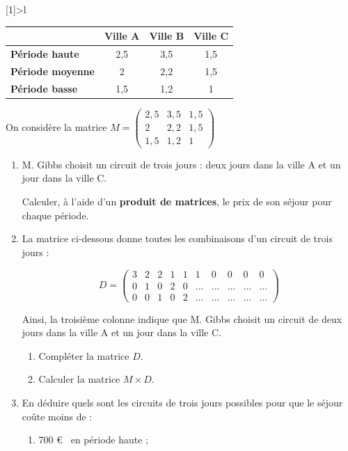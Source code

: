 \begin{spacing}{1.2}
\begin{center}
\newcolumntype{K}[1]{>{}l}
\begin{tabular}{|K{gray}|*{3}{c|}}
 &  \bf Ville A & \bf Ville B & \bf Ville C\\
\hline
\bf Période haute & 2,5 & 3,5 & 1,5\\
\hline
\bf Période moyenne & 2 & 2,2 & 1,5\\
\hline
\bf Période basse & 1,5 & 1,2 & 1\\
\hline
\end{tabular}
\end{center}

On considère la matrice $M=\begin{pmatrix}
2,5&3,5&1,5\\2&2,2&1,5\\1,5&1,2&1
\end{pmatrix}$

\begin{enumerate}[\bf 1.]
\item M. Gibbs choisit un circuit de trois jours : deux jours dans la ville A et un jour dans la ville C.

Calculer, à l'aide d'un \textbf{produit de matrices}, le prix de son séjour pour chaque période.

\item La matrice ci-dessous donne toutes les combinaisons d'un circuit de trois jours :

\[D=\begin{pmatrix}
3&2&2&1&1&1&0&0&0&0\\
0&1&0&2&0&...&...&...&...&...\\
0&0&1&0&2&...&...&...&...&...
\end{pmatrix}\]

Ainsi, la troisième colonne indique que M. Gibbs choisit un circuit de deux jours dans la ville A et un jour dans la ville C.

	\begin{enumerate}[\bf a.]
	\item Compléter la matrice $D$.
	
	\item Calculer la matrice $M\times D$.
	
	\end{enumerate}
\item En déduire quels sont les circuits de trois jours possibles pour que le séjour coûte moins de :
	\begin{enumerate}[\bf a.]
	\item 700 \euro~ en période haute ;
	

\end{enumerate}
\end{enumerate}
\end{spacing}

